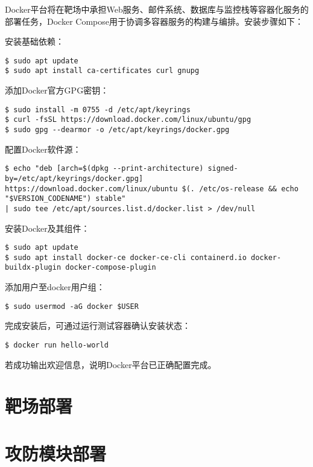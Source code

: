 \documentclass[lang=cn,10pt]{elegantbook}
\begin{document}
Docker平台将在靶场中承担Web服务、邮件系统、数据库与监控栈等容器化服务的部署任务，Docker Compose用于协调多容器服务的构建与编排。安装步骤如下：

安装基础依赖：

\begin{verbatim}
$ sudo apt update
$ sudo apt install ca-certificates curl gnupg
\end{verbatim}

添加Docker官方GPG密钥：

\begin{verbatim}
$ sudo install -m 0755 -d /etc/apt/keyrings
$ curl -fsSL https://download.docker.com/linux/ubuntu/gpg
$ sudo gpg --dearmor -o /etc/apt/keyrings/docker.gpg
\end{verbatim}

配置Docker软件源：

\begin{verbatim}
$ echo "deb [arch=$(dpkg --print-architecture) signed-by=/etc/apt/keyrings/docker.gpg]
https://download.docker.com/linux/ubuntu $(. /etc/os-release && echo "$VERSION_CODENAME") stable"
| sudo tee /etc/apt/sources.list.d/docker.list > /dev/null
\end{verbatim}

安装Docker及其组件：

\begin{verbatim}
$ sudo apt update
$ sudo apt install docker-ce docker-ce-cli containerd.io docker-buildx-plugin docker-compose-plugin
\end{verbatim}

添加用户至docker用户组：

\begin{verbatim}
$ sudo usermod -aG docker $USER
\end{verbatim}

完成安装后，可通过运行测试容器确认安装状态：

\begin{verbatim}
$ docker run hello-world
\end{verbatim}

若成功输出欢迎信息，说明Docker平台已正确配置完成。


\section{靶场部署}


\section{攻防模块部署}
\end{document}
